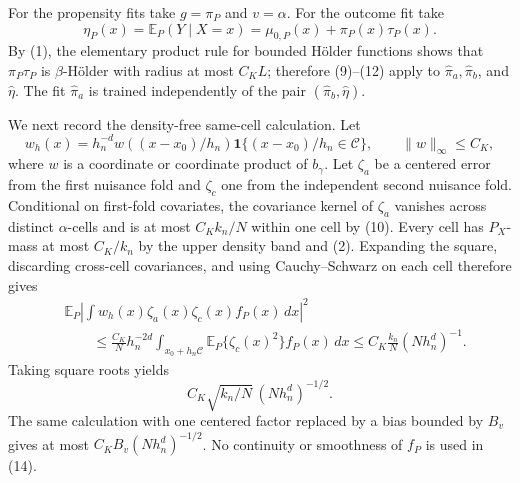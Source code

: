 For the propensity fits take \(g=\pi_P\) and \(v=\alpha\).  For the outcome fit take
\[
\eta_P(x)=\mathbb E_P(Y\mid X=x)
=\mu_{0,P}(x)+\pi_P(x)\tau_P(x).
\tag{13}
\]
By (1), the elementary product rule for bounded H\"older functions shows that \(\pi_P\tau_P\) is \(\beta\)-H\"older with radius at most \(C_KL\); therefore (9)--(12) apply to \(\widehat\pi_a,\widehat\pi_b\), and \(\widehat\eta\).  The fit \(\widehat\pi_a\) is trained independently of the pair \((\widehat\pi_b,\widehat\eta)\).

We next record the density-free same-cell calculation.  Let
\[
w_h(x)=h_n^{-d}w((x-x_0)/h_n)
\mathbf 1\{(x-x_0)/h_n\in\mathcal C\},
\qquad \lVert w\rVert_\infty\le C_K,
\]
where \(w\) is a coordinate or coordinate product of \(b_\gamma\).  Let \(\zeta_a\) be a centered error from the first nuisance fold and \(\zeta_c\) one from the independent second nuisance fold.  Conditional on first-fold covariates, the covariance kernel of \(\zeta_a\) vanishes across distinct \(\alpha\)-cells and is at most \(C_Kk_n/N\) within one cell by (10).  Every cell has \(P_X\)-mass at most \(C_K/k_n\) by the upper density band and (2).  Expanding the square, discarding cross-cell covariances, and using Cauchy--Schwarz on each cell therefore gives
\[
\begin{aligned}
&\mathbb E_P\left|
\int w_h(x)\zeta_a(x)\zeta_c(x)f_P(x)\,dx
\right|^2\\
&\qquad\le
\frac{C_K}{N}h_n^{-2d}
\int_{x_0+h_n\mathcal C}
\mathbb E_P\{\zeta_c(x)^2\}f_P(x)\,dx
\le C_K\frac{k_n}{N}(Nh_n^d)^{-1}.
\end{aligned}
\tag{14}
\]
Taking square roots yields
\[
C_K\sqrt{k_n/N}\,(Nh_n^d)^{-1/2}.
\tag{15}
\]
The same calculation with one centered factor replaced by a bias bounded by \(B_v\) gives at most \(C_KB_v(Nh_n^d)^{-1/2}\).  No continuity or smoothness of \(f_P\) is used in (14).

